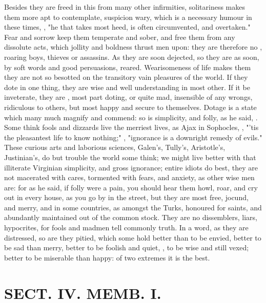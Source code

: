 {Besides they are freed in this from many other infirmities, solitariness makes them more apt to contemplate, suspicion wary, which is a necessary humour in these times, , "he that takes most heed, is often circumvented, and overtaken." Fear and sorrow keep them temperate and sober, and free them from any dissolute acts, which jollity and boldness thrust men upon: they are therefore no , roaring boys, thieves or assassins. As they are soon dejected, so they are as soon, by soft words and good persuasions, reared. Wearisomeness of life makes them they are not so besotted on the transitory vain pleasures of the world. If they dote in one thing, they are wise and well understanding in most other. If it be inveterate, they are , most part doting, or quite mad, insensible of any wrongs, ridiculous to others, but most happy and secure to themselves. Dotage is a state which many much magnify and commend: so is simplicity, and folly, as he said, . Some think fools and dizzards live the merriest lives, as Ajax in Sophocles, , "'tis the pleasantest life to know nothing;" , "ignorance is a downright remedy of evils." These curious arts and laborious sciences, Galen's, Tully's, Aristotle's, Justinian's, do but trouble the world some think; we might live better with that illiterate Virginian simplicity, and gross ignorance; entire idiots do best, they are not macerated with cares, tormented with fears, and anxiety, as other wise men are: for as he said, if folly were a pain, you should hear them howl, roar, and cry out in every house, as you go by in the street, but they are most free, jocund, and merry, and in some countries, as amongst the Turks, honoured for saints, and abundantly maintained out of the common stock. They are no dissemblers, liars, hypocrites, for fools and madmen tell commonly truth. In a word, as they are distressed, so are they pitied, which some hold better than to be envied, better to be sad than merry, better to be foolish and quiet, , to be wise and still vexed; better to be miserable than happy: of two extremes it is the best.

\chapter{ SECT. IV. MEMB. I.}


}
